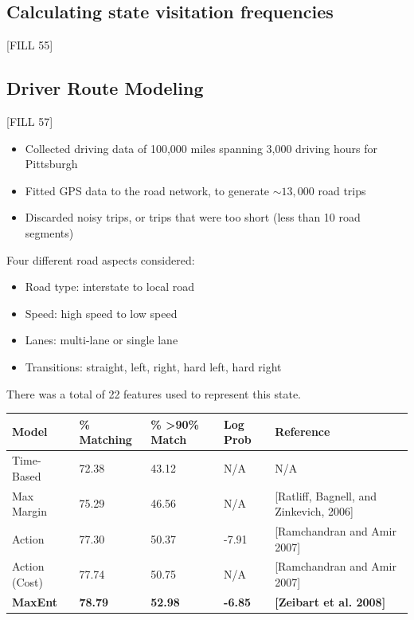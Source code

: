 \documentclass[10pt]{article}
\begin{document}
\subsection*{Calculating state visitation frequencies}
[FILL 55]

\subsection*{Driver Route Modeling}
[FILL 57]
\begin{itemize}
	\item Collected driving data of 100,000 miles spanning 3,000 driving hours for Pittsburgh
	\item Fitted GPS data to the road network, to generate $\sim 13,000$ road trips
	\item Discarded noisy trips, or trips that were too short (less than 10 road segments)
\end{itemize}
Four different road aspects considered:
\begin{itemize}
	\item Road type: interstate to local road
	\item Speed: high speed to low speed
	\item Lanes: multi-lane or single lane
	\item Transitions: straight, left, right, hard left, hard right
\end{itemize}
There was a total of 22 features used to represent this state.
\begin{center} 
	\begin{tabular}{lllll}
        Model & \% Matching & \% \textgreater{}90\% Match & Log Prob & Reference \\ \hline
        Time-Based & 72.38 & 43.12 & N/A & N/A \\
        Max Margin & 75.29 & 46.56 & N/A & {[}Ratliff, Bagnell, and Zinkevich, 2006{]} \\
        Action & 77.30 & 50.37 & -7.91 & {[}Ramchandran and Amir 2007{]} \\
        Action (Cost) & 77.74 & 50.75 & N/A & {[}Ramchandran and Amir 2007{]} \\
        \textbf{MaxEnt} & \textbf{78.79} & \textbf{52.98} & \textbf{-6.85} & \textbf{{[}Zeibart et al. 2008{]}}
        \end{tabular}
\end{center}
\end{document}
